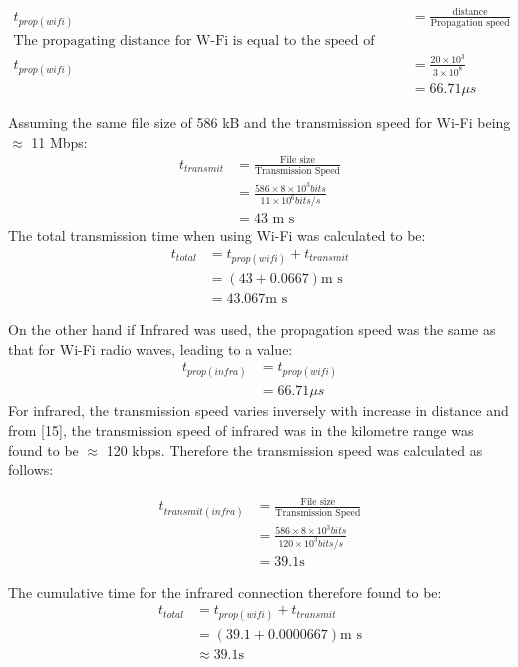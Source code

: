 \begin{align*}
	t_{prop(wifi)} &= \frac{\text{distance}}{\text{Propagation speed}}\\
	\text{The propagating distance for W-Fi is equal to the speed of light so that:}\\
	t_{prop(wifi)} &= \frac{20 \times 10^3}{3 \times 10^8}\\
	&= 66.71 \mu s	
\end{align*}

Assuming the same file size of 586 kB and the transmission speed for Wi-Fi being $\approx$ 11 Mbps:
\begin{align*}
	t_{transmit} &= \frac{\text{File size}}{\text{Transmission Speed}}\\
	&= \frac{586 \times 8 \times 10^3 bits}{11\times 10^6 bits/s}\\
	&= 43 \text{ m s}
\end{align*} 
The total transmission time when using Wi-Fi was calculated to be:
\begin{align*}
	t_{total} &= t_{prop(wifi)} + t_{transmit}\\
	&= (43 + 0.0667) \text{m s}\\
	&= 43.067 \text{m s}
\end{align*}

On the other hand if Infrared was used, the propagation speed was the same as that for Wi-Fi radio waves, leading to a value:
\begin{align*}
	t_{prop(infra)} &= t_{prop(wifi)}\\
	&= 66.71 \mu s
\end{align*}
For infrared, the transmission speed varies inversely with increase in distance and from [15], the transmission speed of infrared was in the kilometre range was found to be $\approx$ 120 kbps. Therefore the transmission speed was calculated as follows: 

\begin{align*}
t_{transmit(infra)} &= \frac{\text{File size}}{\text{Transmission Speed}}\\
&= \frac{586 \times 8 \times 10^3 bits}{120\times 10^3 bits/s}\\
&= 39.1 \text{s}
\end{align*} 

The cumulative time for the infrared connection therefore found to be:
\begin{align*}
t_{total} &= t_{prop(wifi)} + t_{transmit}\\
&= (39.1 + 0.0000667) \text{m s}\\
&\approx 39.1 \text{s}
\end{align*}

